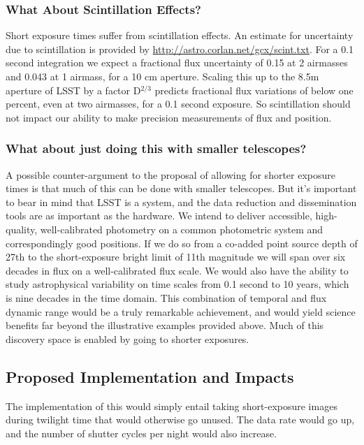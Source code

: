 \subsubsection{What About Scintillation Effects?}

Short exposure times suffer from scintillation effects. An estimate for
uncertainty due to scintillation is provided by
\url{http://astro.corlan.net/gcx/scint.txt}. For a 0.1 second
integration we expect a fractional flux uncertainty of  0.15 at 2
airmasses and 0.043 at 1 airmass, for a 10 cm aperture. Scaling this up
to the 8.5m aperture of LSST by a factor D$^{2/3}$ predicts fractional
flux variations of below one percent, even at two airmasses, for a 0.1
second exposure. So scintillation should not impact our ability to make
precision measurements of flux and position.

\subsubsection{What about just doing this with smaller telescopes?}

A possible counter-argument to the proposal of allowing for shorter
exposure times is that much of this can be done with smaller telescopes.
But it's important to bear in mind that LSST is a system, and the data
reduction and dissemination tools are as important as the hardware. We
intend to deliver accessible, high-quality, well-calibrated photometry
on a common photometric system and correspondingly good positions. If we
do so from a co-added point source depth of 27th to the short-exposure
bright limit of 11th magnitude we will span over six decades in flux on
a well-calibrated flux scale. We would also have the ability to study
astrophysical variability on time scales from 0.1 second to 10 years,
which is nine decades in the time domain. This combination of temporal
and flux dynamic range would be a truly remarkable  achievement, and
would yield science benefits far beyond the illustrative examples
provided above. Much of this discovery space is enabled by going to
shorter exposures.

\subsection{Proposed Implementation and Impacts}

The implementation of this would simply entail taking short-exposure
images during twilight time that would otherwise go unused. The data
rate would go up, and the number of shutter cycles per night would also
increase.

